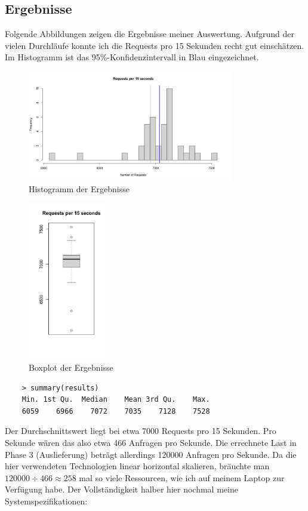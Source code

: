 \documentclass[12pt]{article}
\begin{document}
\subsection*{Ergebnisse}
Folgende Abbildungen zeigen die Ergebnisse meiner Auswertung. 
Aufgrund der vielen Durchläufe konnte ich die Requests pro 15 Sekunden recht gut einschätzen.
Im Histogramm ist das 95\%-Konfidenzintervall in Blau eingezeichnet.

\begin{figure} [H]
	\centering
	\includegraphics[width=0.8\textwidth]{./img/histogram}
	\caption{Histogramm der Ergebnisse}
\end{figure}

\begin{figure} [H]
	\centering
	\includegraphics[width=0.3\textwidth]{./img/boxplot}
	\caption{Boxplot der Ergebnisse}
\end{figure}

\begin{lstlisting}
	> summary(results)
	Min. 1st Qu.  Median    Mean 3rd Qu.    Max. 
	6059    6966    7072    7035    7128    7528 
\end{lstlisting}

Der Durchschnittswert liegt bei etwa 7000 Requests pro 15 Sekunden.
Pro Sekunde wären das also etwa 466 Anfragen pro Sekunde.
Die errechnete Last in Phase 3 (Auslieferung) beträgt allerdings 120000 Anfragen pro Sekunde.
Da die hier verwendeten Technologien linear horizontal skalieren, bräuchte man $120000 \div 466 \approx 258 $ mal so viele Ressourcen, wie ich auf meinem Laptop zur Verfügung habe.
Der Vollständigkeit halber hier nochmal meine Systemspezifikationen:
\end{document}
